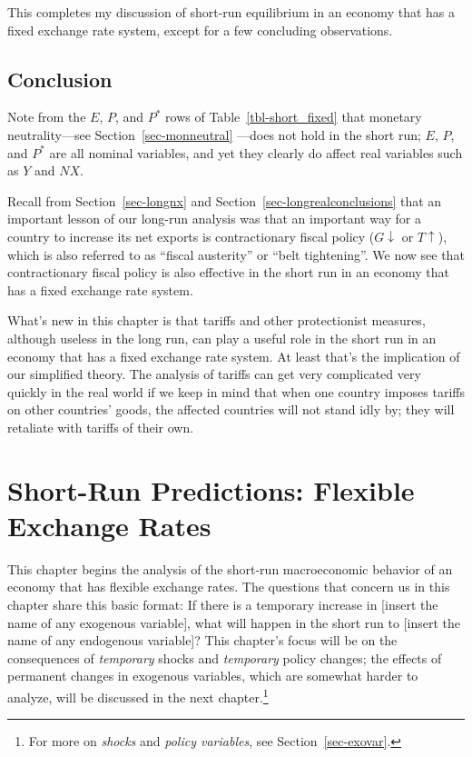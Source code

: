 \documentclass[
  letterpaper,
]{book}
\theoremstyle{plain}
\theoremstyle{remark}
\begin{document}
This completes my discussion of short-run equilibrium in an economy that
has a fixed exchange rate system, except for a few concluding
observations.

\section{Conclusion}\label{sec-conc-shortfix}

Note from the \(E\), \(P\), and \(P^*\) rows of
Table~\ref{tbl-short_fixed} that monetary neutrality---see
Section~\ref{sec-monneutral} ---does not hold in the short run; \(E\),
\(P\), and \(P^*\) are all nominal variables, and yet they clearly do
affect real variables such as \(Y\) and \(NX\).

Recall from Section~\ref{sec-longnx} and
Section~\ref{sec-longrealconclusions} that an important lesson of our
long-run analysis was that an important way for a country to increase
its net exports is contractionary fiscal policy (\(G\downarrow\) or
\(T\uparrow\)), which is also referred to as ``fiscal austerity'' or
``belt tightening''. We now see that contractionary fiscal policy is
also effective in the short run in an economy that has a fixed exchange
rate system.

What's new in this chapter is that tariffs and other protectionist
measures, although useless in the long run, can play a useful role in
the short run in an economy that has a fixed exchange rate system. At
least that's the implication of our simplified theory. The analysis of
tariffs can get very complicated very quickly in the real world if we
keep in mind that when one country imposes tariffs on other countries'
goods, the affected countries will not stand idly by; they will
retaliate with tariffs of their own.


\chapter{Short-Run Predictions: Flexible Exchange
Rates}\label{sec-short-temp}

This chapter begins the analysis of the short-run macroeconomic behavior
of an economy that has flexible exchange rates. The questions that
concern us in this chapter share this basic format: If there is a
temporary increase in {[}insert the name of any exogenous variable{]},
what will happen in the short run to {[}insert the name of any
endogenous variable{]}? This chapter's focus will be on the consequences
of \emph{temporary} shocks and \emph{temporary} policy changes; the
effects of permanent changes in exogenous variables, which are somewhat
harder to analyze, will be discussed in the next chapter.\footnote{For
  more on \emph{shocks} and \emph{policy variables}, see
  Section~\ref{sec-exovar}.}
\end{document}
